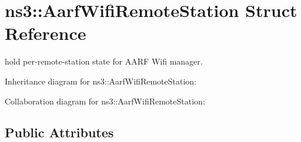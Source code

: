 \hypertarget{structns3_1_1AarfWifiRemoteStation}{}\section{ns3\+:\+:Aarf\+Wifi\+Remote\+Station Struct Reference}
\label{structns3_1_1AarfWifiRemoteStation}


hold per-\/remote-\/station state for A\+A\+RF Wifi manager.  




Inheritance diagram for ns3\+:\+:Aarf\+Wifi\+Remote\+Station\+:


Collaboration diagram for ns3\+:\+:Aarf\+Wifi\+Remote\+Station\+:
\subsection*{Public Attributes}
